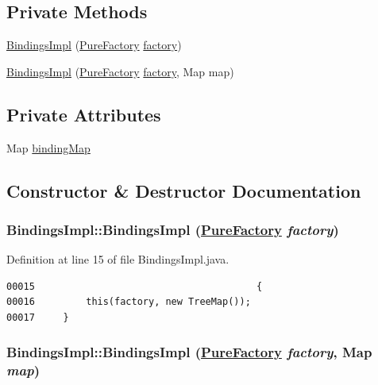 \subsection*{Private Methods}
\begin{CompactItemize}
\item 
\hyperlink{classBindingsImpl_c0}{Bindings\-Impl} (\hyperlink{classPureFactory}{Pure\-Factory} \hyperlink{classDataImpl_o0}{factory})
\item 
\hyperlink{classBindingsImpl_c1}{Bindings\-Impl} (\hyperlink{classPureFactory}{Pure\-Factory} \hyperlink{classDataImpl_o0}{factory}, Map map)
\end{CompactItemize}
\subsection*{Private Attributes}
\begin{CompactItemize}
\item 
Map \hyperlink{classBindingsImpl_o0}{binding\-Map}
\end{CompactItemize}


\subsection{Constructor \& Destructor Documentation}
\hypertarget{classBindingsImpl_c0}{
\subsubsection[BindingsImpl]{\setlength{\rightskip}{0pt plus 5cm}Bindings\-Impl::Bindings\-Impl (\hyperlink{classPureFactory}{Pure\-Factory} {\em factory})}}
\label{classBindingsImpl_c0}




Definition at line 15 of file Bindings\-Impl.java.\footnotesize\begin{verbatim}00015                                       {
00016         this(factory, new TreeMap());
00017     }
\end{verbatim}\normalsize 
\hypertarget{classBindingsImpl_c1}{
\subsubsection[BindingsImpl]{\setlength{\rightskip}{0pt plus 5cm}Bindings\-Impl::Bindings\-Impl (\hyperlink{classPureFactory}{Pure\-Factory} {\em factory}, Map {\em map})}}
\label{classBindingsImpl_c1}




